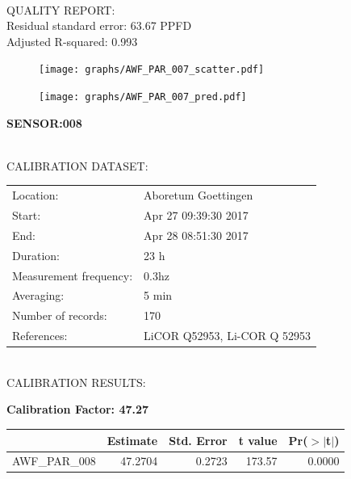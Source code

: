 \documentclass[oneside]{report}
\begin{document}
\hrulefill\\
QUALITY REPORT:\\
Residual standard error: 63.67 PPFD\\
Adjusted R-squared: 0.993



\begin{figure}[H]
  \centering
  \texttt{[image: graphs/AWF\_PAR\_007\_scatter.pdf]}
\end{figure}




\begin{figure}[H]
  \centering
  \texttt{[image: graphs/AWF\_PAR\_007\_pred.pdf]}
\end{figure}

\pagebreak


\begin{center}
\large{\textbf{SENSOR:008}}\\
\end{center}

\hrulefill\\
CALIBRATION DATASET:\\
\begin{table}[h!]
  \centering
  \label{tab:table1}
  \begin{tabular}{ll}
    Location: & Aboretum Goettingen\\ 
    
    
    Start:  & Apr 27 09:39:30 2017 \\
    End:   & Apr 28 08:51:30 2017\\ 
    Duration: & 23 h\\
    Measurement frequency: & 0.3hz\\
    Averaging:  &5 min\\
    Number of records: & 170 \\
    References: & LiCOR Q52953, Li-COR Q 52953 \\
  \end{tabular}
\end{table}

\hrulefill\\
CALIBRATION RESULTS:\\


\begin{center}
\textbf{\large{Calibration Factor: 47.27}}\\
\end{center}
\begin{table}[ht]
\centering
\begin{tabular}{rrrrr}
  \hline
 & Estimate & Std. Error & t value & Pr($>$$|$t$|$) \\ 
  \hline
AWF\_PAR\_008 & 47.2704 & 0.2723 & 173.57 & 0.0000 \\ 
   \hline
\end{tabular}
\end{table}
\end{document}
